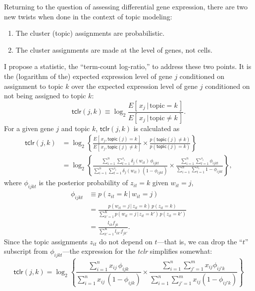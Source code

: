 \documentclass[final]{siamart171218}
\begin{document}
Returning to the question of assessing differential gene expression,
there are two new twists when done in the context of topic modeling:
\begin{enumerate}
  
\item The cluster (topic) assignments are probabilistic.

\item The cluster assignments are made at the level of genes, not
  cells.

\end{enumerate}
I propose a statistic, the ``term-count log-ratio,'' to address these
two points. It is the (logarithm of the) expected expression level of
gene $j$ conditioned on assignment to topic $k$ over the expected
expression level of gene $j$ conditioned on not being assigned to
topic $k$:
\begin{equation}
\mathsf{tclr}(j,k) \equiv
\log_2 \frac{E[\,x_j \,|\, \mathrm{topic} = k\,]}
            {E[\,x_j \,|\, \mathrm{topic} \neq k\,]}.
\end{equation}
For a given gene $j$ and topic $k$, $\mathsf{tclr}(j,k)$ is calculated
as
\begin{align}
\mathsf{tclr}(j,k) &=
\log_2 \left\{ \frac{E[\, x_j, \mathsf{topic}(j) = k \,]}
                    {E[\, x_j, \mathsf{topic}(j) \neq k\,]} \times
               \frac{p(\mathsf{topic}(j) \neq k)}
                    {p(\mathsf{topic}(j) = k)} \right\} \nonumber \\
&= \log_2 \left\{ 
\frac{\sum_{i=1}^n \sum_{t=1}^{s_i} \delta_j(w_{it}) \, \phi_{ijkt}}
     {\sum_{i=1}^n \sum_{t=1}^{s_i} \delta_j(w_{it}) \, (1 - \phi_{ijkt})}
     \times \frac{\sum_{i=1}^n \sum_{t=1}^{s_i} \phi_{ijkt}}
                 {\sum_{i=1}^n \sum_{t=1}^{s_i} 1-\phi_{ijkt}} 
\right\},
\label{eq:tclr}
\end{align}
where $\phi_{ijkt}$ is the posterior probability of $z_{it} = k$ given
$w_{it} = j$,
\begin{align}
\phi_{ijkt} &\equiv p(z_{it} = k \,|\, w_{it} = j) \nonumber \\
&= \frac{p(w_{it} = j \,|\, z_{it} = k) \, p(z_{it} = k)}
        {\sum_{k'=1}^K p(w_{it} = j \,|\, z_{it} = k') \, p(z_{it} = k')} 
   \nonumber \\
&= \frac{l_{ik} f_{jk}}
        {\sum_{k'=1}^K l_{ik'} f_{jk'}}.
\end{align}
Since the topic assignments $z_{it}$ do not depend on $t$---that is,
we can drop the ``$t$'' subscript from $\phi_{ijkt}$---the expression
for the {\em tclr} simplifies somewhat:
\begin{equation}
\mathsf{tclr}(j,k) = \log_2 \left\{ 
\frac{\sum_{i=1}^n x_{ij} \, \phi_{ijk}}
     {\sum_{i=1}^n x_{ij} \, (1 - \phi_{ijk})}
     \times \frac{\sum_{i=1}^n \sum_{j'=1}^m x_{ij} \phi_{ij'k}}
                 {\sum_{i=1}^n \sum_{j'=1}^m x_{ij} (1-\phi_{ij'k})} \right\}
\end{equation}
\end{document}
